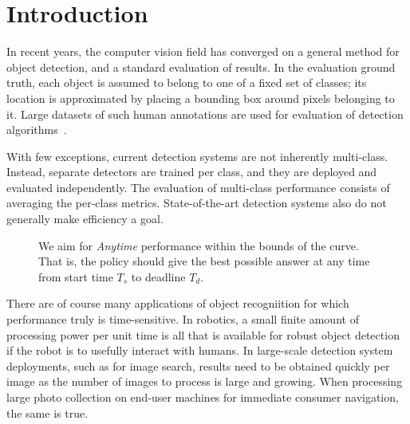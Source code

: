 \section{Introduction}

In recent years, the computer vision field has converged on a general method for object detection, and a standard evaluation of results.
In the evaluation ground truth, each object is assumed to belong to one of a fixed set of classes; its location is approximated by placing a bounding box around pixels belonging to it.
Large datasets of such human annotations are used for evaluation of detection algorithms~\cite{pascal-voc-2010,imagenet_cvpr09}.

With few exceptions, current detection systems are not inherently multi-class.
Instead, separate detectors are trained per class, and they are deployed and evaluated independently.
The evaluation of multi-class performance consists of averaging the per-class metrics.
State-of-the-art detection systems also do not generally make efficiency a goal.

\begin{figure}[ht!]
  \caption{We aim for \emph{Anytime} performance within the bounds of the curve. That is, the policy should give the best possible answer at any time from start time $T_s$ to deadline $T_d$.}
  \label{fig:evaluation}
\end{figure}

There are of course many applications of object recogniition for which performance truly is time-sensitive.
In robotics, a small finite amount of processing power per unit time is all that is available for robust object detection if the robot is to usefully interact with humans.
In large-scale detection system deployments, such as for image search, results need to be obtained quickly per image as the number of images to process is large and growing.
When processing large photo collection on end-user machines for immediate consumer navigation, the same is true.

